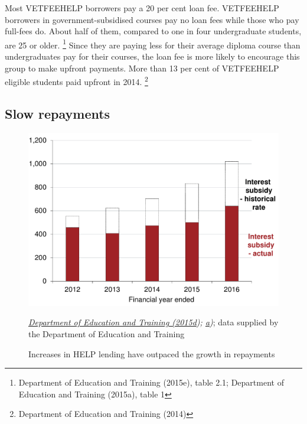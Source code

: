 \documentclass[embargoed]{grattan}
\begin{document}
Most \gls{VETFEEHELP} borrowers pay a 20 per cent loan fee.
\gls{VETFEEHELP} borrowers in government-subsidised courses pay no loan fees while those who pay full-fees do.
About half of them, compared to one in four undergraduate students, are 25 or older.%
\footnote{Department of Education and Training (2015e), table 2.1; Department of Education and Training (2015a), table 1} Since they are paying less for their average diploma course than undergraduates pay for their courses, the loan fee is more likely to encourage this group to make upfront payments.
More than 13 per cent of \gls{VETFEEHELP} eligible students paid upfront in 2014.%
\footnote{Department of Education and Training (2014)}

\subsection{Slow repayments }\label{slow-repayments}

\begin{figure}
\caption{Increases in \gls{HELP} lending have outpaced the growth in repayments}\label{fig:fig7-increases-help-lending-outpaced-growth-repayments}


\includegraphics[page=7]{atlas/Chartpack.pdf}

%
{\emph{\protect\hyperlink{_ENREF_27}{Department of Education and Training (2015d}); \protect\hyperlink{_ENREF_24}{a})}; data supplied by the Department of Education and Training}
\end{figure}
\end{document}

